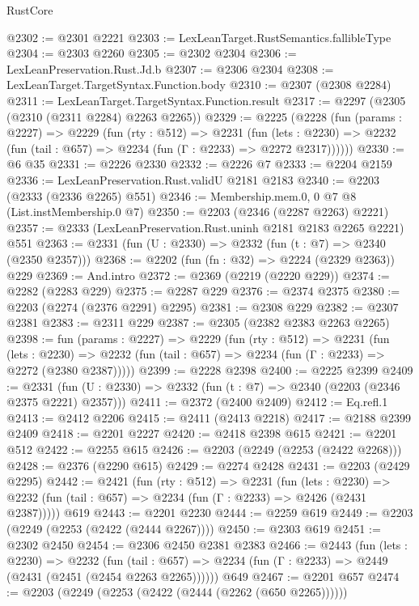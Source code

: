 \begin{lexlean}{RustCore}
\begin{coremodule}
@2302 := @2301 @2221
@2303 := LexLeanTarget.RustSemantics.fallibleType
@2304 := @2303 @2260
@2305 := @2302 @2304
@2306 := LexLeanPreservation.Rust.Jd.b
@2307 := @2306 @2304
@2308 := LexLeanTarget.TargetSyntax.Function.body
@2310 := @2307 (@2308 @2284)
@2311 := LexLeanTarget.TargetSyntax.Function.result
@2317 := @2297 (@2305 (@2310 (@2311 @2284) @2263 @2265))
@2329 := @2225
    (@2228
      (fun (params : @2227) =>
      @2229
        (fun (rty : @512) =>
        @2231
          (fun (lets : @2230) =>
          @2232 (fun (tail : @657) => @2234 (fun (Γ : @2233) => @2272 @2317))))))
@2330 := @6 @35
@2331 := @2226 @2330
@2332 := @2226 @7
@2333 := @2204 @2159
@2336 := LexLeanPreservation.Rust.validU @2181 @2183
@2340 := @2203 (@2333 (@2336 @2265) @551)
@2346 := Membership.mem.{0, 0} @7 @8 (List.instMembership.{0} @7)
@2350 := @2203 (@2346 (@2287 @2263) @2221)
@2357 := @2333 (LexLeanPreservation.Rust.uninh @2181 @2183 @2265 @2221) @551
@2363 := @2331 (fun (U : @2330) => @2332 (fun (t : @7) => @2340 (@2350 @2357)))
@2368 := @2202 (fun (fn : @32) => @2224 (@2329 @2363)) @229
@2369 := And.intro
@2372 := @2369 (@2219 (@2220 @229))
@2374 := @2282 (@2283 @229)
@2375 := @2287 @229
@2376 := @2374 @2375
@2380 := @2203 (@2274 (@2376 @2291) @2295)
@2381 := @2308 @229
@2382 := @2307 @2381
@2383 := @2311 @229
@2387 := @2305 (@2382 @2383 @2263 @2265)
@2398 := fun (params : @2227) =>
  @2229
    (fun (rty : @512) =>
    @2231
      (fun (lets : @2230) =>
      @2232 (fun (tail : @657) => @2234 (fun (Γ : @2233) => @2272 (@2380 @2387)))))
@2399 := @2228 @2398
@2400 := @2225 @2399
@2409 := @2331 (fun (U : @2330) => @2332 (fun (t : @7) => @2340 (@2203 (@2346 @2375 @2221) @2357)))
@2411 := @2372 (@2400 @2409)
@2412 := Eq.refl.{1}
@2413 := @2412 @2206
@2415 := @2411 (@2413 @2218)
@2417 := @2188 @2399 @2409
@2418 := @2201 @2227
@2420 := @2418 @2398 @615
@2421 := @2201 @512
@2422 := @2255 @615
@2426 := @2203 (@2249 (@2253 (@2422 @2268)))
@2428 := @2376 (@2290 @615)
@2429 := @2274 @2428
@2431 := @2203 (@2429 @2295)
@2442 := @2421
    (fun (rty : @512) =>
    @2231
      (fun (lets : @2230) =>
      @2232 (fun (tail : @657) => @2234 (fun (Γ : @2233) => @2426 (@2431 @2387)))))
    @619
@2443 := @2201 @2230
@2444 := @2259 @619
@2449 := @2203 (@2249 (@2253 (@2422 (@2444 @2267))))
@2450 := @2303 @619
@2451 := @2302 @2450
@2454 := @2306 @2450 @2381 @2383
@2466 := @2443
    (fun (lets : @2230) =>
    @2232
      (fun (tail : @657) => @2234 (fun (Γ : @2233) => @2449 (@2431 (@2451 (@2454 @2263 @2265))))))
    @649
@2467 := @2201 @657
@2474 := @2203 (@2249 (@2253 (@2422 (@2444 (@2262 (@650 @2265))))))

\end{coremodule}
\end{lexlean}

